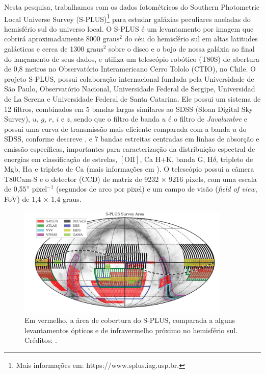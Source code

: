 Nesta pesquisa, trabalhamos com os dados fotométricos do Southern Photometric Local Universe Survey (S-PLUS)\footnote{Mais informações em: https://www.splus.iag.usp.br.} para estudar galáxias peculiares aneladas do hemisfério sul do universo local. O S-PLUS é um levantamento por imagem que cobrirá aproximadamente 8000 $\mathrm{graus}^{2}$ do céu do hemisfério sul em altas latitudes galácticas e cerca de 1300 $\mathrm{graus}^{2}$ sobre o disco e o bojo de nossa galáxia ao final do lançamento de seus dados, e utiliza um telescópio robótico (T80S) de abertura de 0,8 metros no Observatório Interamericano Cerro Tololo (CTIO), no Chile. O projeto S-PLUS, possui colaboração internacional fundada pela Universidade de São Paulo, Observatório Nacional, Universidade Federal de Sergipe, Universidad de La Serena e Universidade Federal de Santa Catarina. Ele possui um sistema de 12 filtros, combinados em 5 bandas largas similares ao SDSS (Sloan Digital Sky Survey), $u$, $g$, $r$, $i$ e $z$, sendo que o filtro de banda $u$ é o filtro de \emph{Javalambre} e possui uma curva de transmissão mais eficiente comparada com a banda $u$ do SDSS, conforme descreve , e 7 bandas estreitas centradas em linhas de absorção e emissão específicas, importantes para caracterização da distribuição espectral de energias em classificação de estrelas, $[\text{OII}]$, Ca H+K, banda G, H$\delta$, tripleto de Mgb, H$\alpha$ e tripleto de Ca (mais informações em ). O telescópio possui a câmera T80Cam-S e o detector (CCD) de matriz de 9232 × 9216 pixels, com uma escala de 0,55'' $\mathrm{pixel}^{-1}$ (segundos de arco por pixel) e um campo de visão (\emph{field of view}, FoV) de 1,4 × 1,4 graus.

\begin{figure}[h]
  \centering 
  \includegraphics[width=0.9\textwidth]{Imagens/surveyarea.PNG} 
  \caption[Área de cobertura do S-PLUS.]{Em vermelho, a área de cobertura do S-PLUS, comparada a alguns levantamentos ópticos e de infravermelho próximo no hemisfério sul. Créditos: .}
  \label{fig:surveyarea} 
\end{figure}

